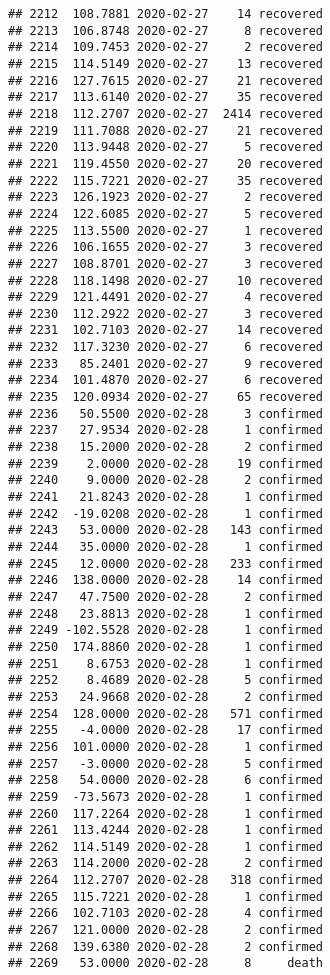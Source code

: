 \documentclass[
]{article}
\begin{document}
\begin{verbatim}
## 2212  108.7881 2020-02-27    14 recovered
## 2213  106.8748 2020-02-27     8 recovered
## 2214  109.7453 2020-02-27     2 recovered
## 2215  114.5149 2020-02-27    13 recovered
## 2216  127.7615 2020-02-27    21 recovered
## 2217  113.6140 2020-02-27    35 recovered
## 2218  112.2707 2020-02-27  2414 recovered
## 2219  111.7088 2020-02-27    21 recovered
## 2220  113.9448 2020-02-27     5 recovered
## 2221  119.4550 2020-02-27    20 recovered
## 2222  115.7221 2020-02-27    35 recovered
## 2223  126.1923 2020-02-27     2 recovered
## 2224  122.6085 2020-02-27     5 recovered
## 2225  113.5500 2020-02-27     1 recovered
## 2226  106.1655 2020-02-27     3 recovered
## 2227  108.8701 2020-02-27     3 recovered
## 2228  118.1498 2020-02-27    10 recovered
## 2229  121.4491 2020-02-27     4 recovered
## 2230  112.2922 2020-02-27     3 recovered
## 2231  102.7103 2020-02-27    14 recovered
## 2232  117.3230 2020-02-27     6 recovered
## 2233   85.2401 2020-02-27     9 recovered
## 2234  101.4870 2020-02-27     6 recovered
## 2235  120.0934 2020-02-27    65 recovered
## 2236   50.5500 2020-02-28     3 confirmed
## 2237   27.9534 2020-02-28     1 confirmed
## 2238   15.2000 2020-02-28     2 confirmed
## 2239    2.0000 2020-02-28    19 confirmed
## 2240    9.0000 2020-02-28     2 confirmed
## 2241   21.8243 2020-02-28     1 confirmed
## 2242  -19.0208 2020-02-28     1 confirmed
## 2243   53.0000 2020-02-28   143 confirmed
## 2244   35.0000 2020-02-28     1 confirmed
## 2245   12.0000 2020-02-28   233 confirmed
## 2246  138.0000 2020-02-28    14 confirmed
## 2247   47.7500 2020-02-28     2 confirmed
## 2248   23.8813 2020-02-28     1 confirmed
## 2249 -102.5528 2020-02-28     1 confirmed
## 2250  174.8860 2020-02-28     1 confirmed
## 2251    8.6753 2020-02-28     1 confirmed
## 2252    8.4689 2020-02-28     5 confirmed
## 2253   24.9668 2020-02-28     2 confirmed
## 2254  128.0000 2020-02-28   571 confirmed
## 2255   -4.0000 2020-02-28    17 confirmed
## 2256  101.0000 2020-02-28     1 confirmed
## 2257   -3.0000 2020-02-28     5 confirmed
## 2258   54.0000 2020-02-28     6 confirmed
## 2259  -73.5673 2020-02-28     1 confirmed
## 2260  117.2264 2020-02-28     1 confirmed
## 2261  113.4244 2020-02-28     1 confirmed
## 2262  114.5149 2020-02-28     1 confirmed
## 2263  114.2000 2020-02-28     2 confirmed
## 2264  112.2707 2020-02-28   318 confirmed
## 2265  115.7221 2020-02-28     1 confirmed
## 2266  102.7103 2020-02-28     4 confirmed
## 2267  121.0000 2020-02-28     2 confirmed
## 2268  139.6380 2020-02-28     2 confirmed
## 2269   53.0000 2020-02-28     8     death

\end{verbatim}
\end{document}
